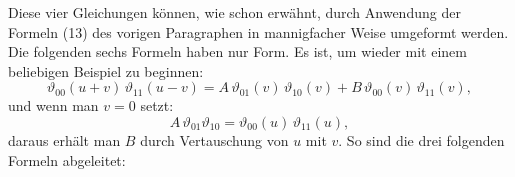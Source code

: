 
Diese vier Gleichungen können, wie schon erwähnt, durch Anwendung der Formeln (13) des vorigen Paragraphen in mannigfacher Weise umgeformt werden. Die folgenden sechs Formeln haben nur  Form. Es ist, um wieder mit einem beliebigen Beispiel zu beginnen:
\[
\vartheta_{00}(u+v)\,\vartheta_{11}(u-v) = A\,\vartheta_{01}(v)\,\vartheta_{10}(v) + B\,\vartheta_{00}(v)\,\vartheta_{11}(v),
\]
und wenn man $v=0$ setzt:
\[
A\,\vartheta_{01}\vartheta_{10} = \vartheta_{00}(u)\,\vartheta_{11}(u),
\]
daraus erhält man $B$ durch Vertauschung von $u$ mit $v$. So sind die drei folgenden Formeln abgeleitet:

